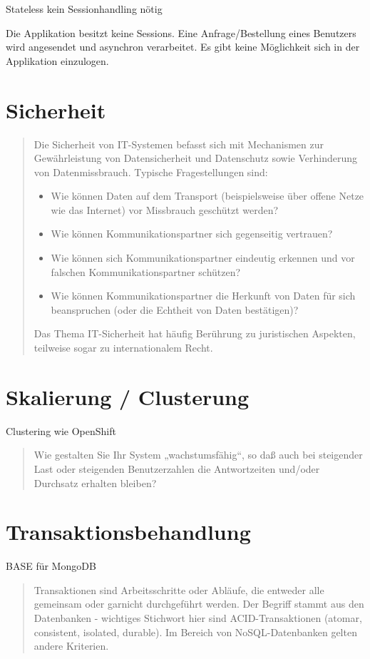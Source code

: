 Stateless kein Sessionhandling nötig

Die Applikation besitzt keine Sessions. Eine Anfrage/Bestellung eines Benutzers wird angesendet und asynchron verarbeitet. Es gibt keine Möglichkeit sich in der Applikation einzulogen.

\section{Sicherheit}

\begin{quote}
	Die Sicherheit von IT-Systemen befasst sich mit Mechanismen zur Gewährleistung von Datensicherheit und Datenschutz sowie Verhinderung von Datenmissbrauch.
	Typische Fragestellungen sind:
	\begin{itemize}
		\item Wie können Daten auf dem Transport (beispielsweise über offene Netze wie das Internet) vor Missbrauch geschützt werden?
		\item Wie können Kommunikationspartner sich gegenseitig vertrauen?
		\item Wie können sich Kommunikationspartner eindeutig erkennen und vor falschen Kommunikationspartner schützen?
		\item Wie können Kommunikationspartner die Herkunft von Daten für sich beanspruchen (oder die Echtheit von Daten bestätigen)?
	\end{itemize}
	Das Thema IT-Sicherheit hat häufig Berührung zu juristischen Aspekten, teilweise sogar zu internationalem Recht.
\end{quote}

\section{Skalierung / Clusterung}

Clustering wie OpenShift

\begin{quote}
	Wie gestalten Sie Ihr System „wachstumsfähig“, so daß auch bei steigender Last oder steigenden Benutzerzahlen die Antwortzeiten und/oder Durchsatz erhalten bleiben?
\end{quote}

\section{Transaktionsbehandlung}

BASE für MongoDB

\begin{quote}
	Transaktionen sind Arbeitsschritte oder Abläufe, die entweder alle gemeinsam oder garnicht durchgeführt werden. Der Begriff stammt aus den Datenbanken - wichtiges Stichwort hier sind ACID-Transaktionen (atomar, consistent, isolated, durable). Im Bereich von NoSQL-Datenbanken gelten andere Kriterien.
\end{quote}

